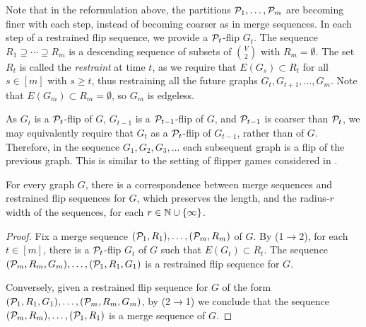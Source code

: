 Note that in the reformulation above,
the partitions $\cal P_1,\ldots,\cal P_m$ are becoming finer with each step, instead of becoming coarser as in merge sequences. In each step of a restrained flip sequence, we provide a $\cal P_t$-flip $G_t$.
The sequence $R_1\supseteq \cdots\supseteq R_m$
is a descending sequence of subsets of $V\choose 2$ with $R_m=\emptyset$. The set $R_t$ is called the \emph{restraint} at time $t$, as we require that $E(G_s)\subset R_t$ for all $s\in[m]$ with $s\ge t$, thus restraining all the future graphs $G_t,G_{t+1},\ldots,G_m$.  Note that  $E(G_m)\subset R_m=\emptyset$, so $G_m$ is edgeless.

As $G_t$ is a $\cal P_t$-flip of $G$, 
$G_{t-1}$ is a $\cal P_{t-1}$-flip of $G$, and $\cal P_{t-1}$ is coarser than $\cal P_t$,
we may equivalently require that $G_t$ as a $\cal P_{t}$-flip of $G_{t-1}$, rather than of $G$.
Therefore, in the sequence $G_1,G_2,G_3,\ldots$ 
each subsequent graph is a flip of the previous graph.
This is similar to the setting of flipper games considered in \cite{flippers}.




\begin{lemma}\label{lem:mw-flip seq}
    For every graph $G$,
    there is a correspondence between merge sequences and restrained flip sequences for $G$,
    which preserves the length, and the radius-$r$ width of the sequences, for each $r\in\N\cup\set{\infty}$.
\end{lemma}




\begin{proof}
    Fix a merge sequence 
    $(\cal P_1,R_1),\ldots,(\cal P_m,R_m)$
    of $G$.
 By  (1$\rightarrow$2),
 for each $t\in[m]$,
    there is a  $\cal P_t$-flip $G_t$ of $G$ such that 
$E(G_t)\subset R_t$.
    The sequence 
    $(\cal P_m,R_m,G_m),\ldots,(\cal P_1,R_1,G_1)$
    is a restrained flip sequence for $G$.
    
    Conversely,
    given a restrained flip sequence for $G$ of the form $(\cal P_1,R_1,G_1),\ldots,(\cal P_m,R_m,G_m)$,
    by  (2$\rightarrow$1) we conclude that 
    the sequence $(\cal P_m,R_m),\ldots,(\cal P_1,R_1)$ is a merge sequence of $G$.
\end{proof}

